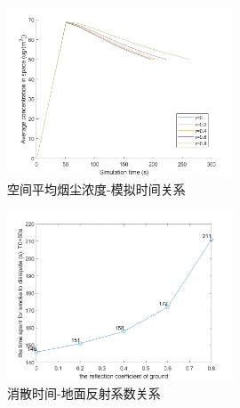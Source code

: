 \documentclass{article}
\begin{document}
	\begin{figure}[htbp]
		\centering
		\includegraphics[width=0.6\textwidth]{pics/relation-avg_concentration-t.png}
		\caption{空间平均烟尘浓度-模拟时间关系}
		\label{fig19}
    \end{figure}
    \begin{figure}[htbp]
        \centering
		\includegraphics[width=0.6\textwidth]{pics/relation-dissipate_time-r.png}
		\caption{消散时间-地面反射系数关系}
		\label{fig20}
	\end{figure}
\end{document}
